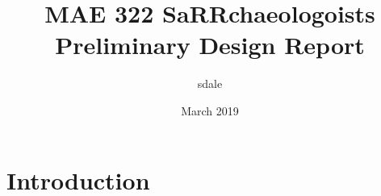 \documentclass{article}
\title{MAE 322 SaRRchaeologoists Preliminary Design Report}
\author{sdale }
\date{March 2019}
\begin{document}
\maketitle

\section{Introduction}
\end{document}
